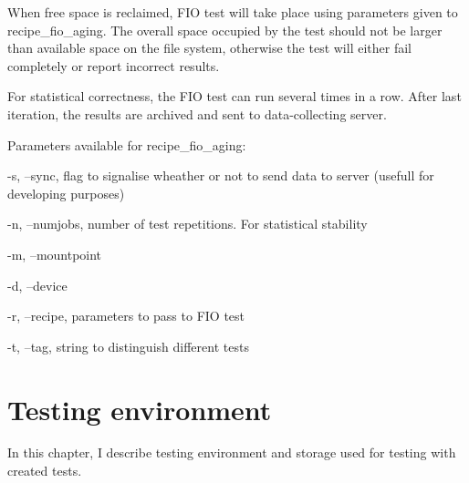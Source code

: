 \documentclass[
  color, %
  table, %
  lof,   %
  lot,   %
]{fithesis3}
\begin{document}
When free space is reclaimed, FIO test will take place using parameters given to recipe\_fio\_aging. The overall space occupied by the test should not be larger than available space on the file system, otherwise the test will either fail completely or report incorrect results.

For statistical correctness, the FIO test can run several times in a row. After last iteration, the results are archived and sent to data-collecting server.

Parameters available for recipe\_fio\_aging:
\begin{compactenum}
  \item -s, --sync, flag to signalise wheather or not to send data to server (usefull for developing purposes)
  \item -n, --numjobs, number of test repetitions. For statistical stability
  \item -m, --mountpoint
  \item -d, --device
  \item -r, --recipe, parameters to pass to FIO test
  \item -t, --tag, string to distinguish different tests
  \end{compactenum}

\chapter{Testing environment}
In this chapter, I describe testing environment and storage used for testing with created tests.
\end{document}
